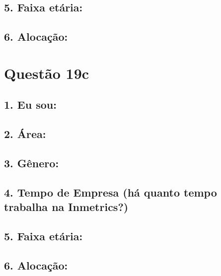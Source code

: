 \documentclass[]{book}
\begin{document}
\hypertarget{faixa-etaria-46}{%
\subsection{5. Faixa etária:}\label{faixa-etaria-46}}

\hypertarget{alocacao-46}{%
\subsection{6. Alocação:}\label{alocacao-46}}

\hypertarget{questao-19c}{%
\section{Questão 19c}\label{questao-19c}}

\hypertarget{eu-sou-47}{%
\subsection{1. Eu sou:}\label{eu-sou-47}}

\hypertarget{area-47}{%
\subsection{2. Área:}\label{area-47}}

\hypertarget{genero-47}{%
\subsection{3. Gênero:}\label{genero-47}}

\hypertarget{tempo-de-empresa-ha-quanto-tempo-trabalha-na-inmetrics-47}{%
\subsection{4. Tempo de Empresa (há quanto tempo trabalha na Inmetrics?)}\label{tempo-de-empresa-ha-quanto-tempo-trabalha-na-inmetrics-47}}

\hypertarget{faixa-etaria-47}{%
\subsection{5. Faixa etária:}\label{faixa-etaria-47}}

\hypertarget{alocacao-47}{%
\subsection{6. Alocação:}\label{alocacao-47}}
\end{document}
